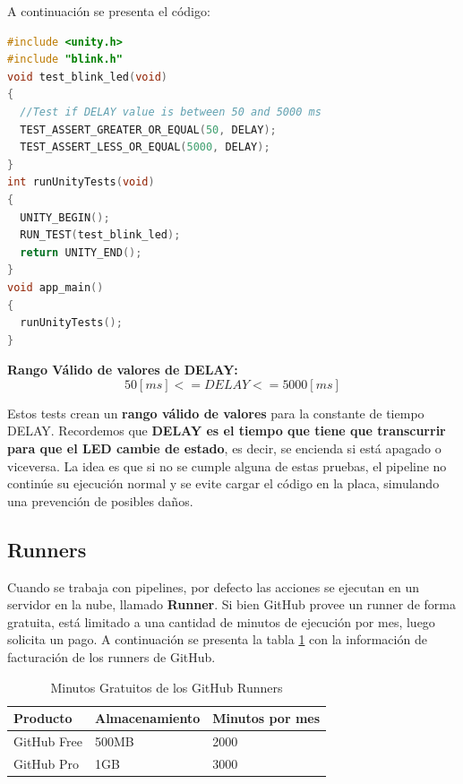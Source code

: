 A continuación se presenta el código:

\begin{lstlisting}[language=C, caption={UnityTests}, label={cod:unity-tests}, captionpos=b]
#include <unity.h>
#include "blink.h"
void test_blink_led(void)
{
  //Test if DELAY value is between 50 and 5000 ms
  TEST_ASSERT_GREATER_OR_EQUAL(50, DELAY);
  TEST_ASSERT_LESS_OR_EQUAL(5000, DELAY);
}
int runUnityTests(void)
{
  UNITY_BEGIN();
  RUN_TEST(test_blink_led);
  return UNITY_END();
}
void app_main()
{
  runUnityTests();
}
\end{lstlisting}

\textbf{Rango Válido de valores de DELAY:}
 $$50[ms] <= DELAY <= 5000[ms]$$

Estos tests crean un \textbf{rango válido de valores} para la constante de tiempo DELAY. Recordemos que \textbf{DELAY es el tiempo que tiene que transcurrir para que el LED cambie de estado}, es decir, se encienda si está apagado o viceversa. La idea es que si no se cumple alguna de estas pruebas, el pipeline no continúe su ejecución normal y se evite cargar el código en la placa, simulando una prevención de posibles daños.

\newpage
\subsection{Runners}

Cuando se trabaja con pipelines, por defecto las acciones se ejecutan en un servidor en la nube, llamado \textbf{Runner}. Si bien GitHub provee un runner de forma gratuita, está limitado a una cantidad de minutos de ejecución por mes, luego solicita un pago. A continuación se presenta la tabla \ref{tab:minutos-gratuitos} con la información de facturación de los runners de GitHub.

\begin{table}[H]
\begin{center}
\begin{tabular}{lll}
\hline
\multicolumn{1}{|l|}{\textbf{Producto}} & \multicolumn{1}{l|}{\textbf{Almacenamiento}} & \multicolumn{1}{l|}{\textbf{Minutos por mes}} \\ \hline
\multicolumn{1}{|l|}{GitHub Free} & \multicolumn{1}{l|}{500MB} & \multicolumn{1}{l|}{2000} \\ \hline
\multicolumn{1}{|l|}{GitHub Pro} & \multicolumn{1}{l|}{1GB} & \multicolumn{1}{l|}{3000} \\ \hline
\end{tabular}
\caption{Minutos Gratuitos de los GitHub Runners}
\label{tab:minutos-gratuitos}
\end{center}
\end{table}

